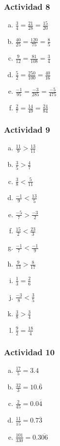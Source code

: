 \documentclass[a4paper, twocolumn]{article}
\begin{document}
\subsubsection*{Actividad 8}
\begin{enumerate}[a)]
\item $\frac{3}{4} = \frac{21}{28} = \frac{15}{20}$
\item $\frac{40}{25} = \frac{120}{75} = \frac{8}{5}$
\item $\frac{9}{12} = \frac{81}{108} = \frac{3}{4}$
\item $\frac{5}{2} = \frac{250}{100} = \frac{40}{16}$
\item $\frac{-1}{95} = \frac{-3}{285} = \frac{-5}{475}$
\item $\frac{2}{7} = \frac{14}{49} = \frac{24}{84}$
\end{enumerate}
\subsubsection*{Actividad 9}
\begin{enumerate}[a)]
\item $\frac{11}{9} > \frac{13}{11}$
\item $\frac{3}{5} > \frac{4}{7}$
\item $\frac{3}{8} < \frac{5}{11}$
\item $\frac{-1}{9} < \frac{13}{5}$
\item $\frac{-5}{7} > \frac{-3}{2}$
\item $\frac{15}{2} < \frac{23}{3}$
\item $\frac{-1}{7} < \frac{-1}{9}$
\item $\frac{9}{13} > \frac{8}{17}$
\item $\frac{1}{3} = \frac{2}{6}$
\item $\frac{-3}{8} < \frac{3}{5}$
\item $\frac{3}{8} > \frac{3}{4}$
\item $\frac{9}{2} = \frac{18}{4}$
\end{enumerate}


\subsubsection*{Actividad 10}
\begin{enumerate}[a)]
\item $\frac{17}{5}=3.4$
\item $\frac{32}{3}=10.\overline{6}$
\item $\frac{2}{45}=0.0\overline{4}$
\item $\frac{11}{15}=0.7\overline{3}$
\item $\frac{101}{330}=0.3\overline{06}$
\end{enumerate}
\end{document}
